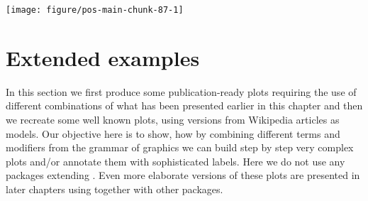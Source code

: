 \documentclass[krantz2]{krantz}\usepackage{knitr}%
\begin{document}
\begin{knitrout}\footnotesize
{}\color{fgcolor}

{\centering \texttt{[image: figure/pos-main-chunk-87-1]} 

}



\end{knitrout}

\section{Extended examples}
In this section we first produce some publication-ready plots requiring the use of different combinations of what has been presented earlier in this chapter and then we recreate some well known plots, using versions from Wikipedia articles as models. Our objective here is to show, how by combining different terms and modifiers from the grammar of graphics we can build step by step very complex plots and/or annotate them with sophisticated labels. Here we do not use any packages extending \ggplot. Even more elaborate versions of these plots are presented in later chapters using \ggplot together with other packages.
\end{document}
